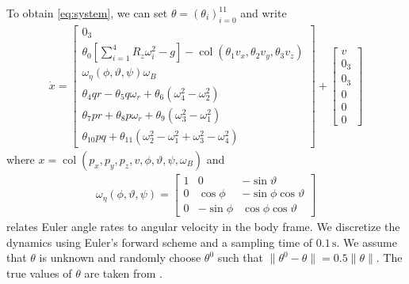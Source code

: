 \documentclass[journal,twoside,web,final]{ieeecolor}
\theoremstyle{definition}
\begin{document}
To obtain \cref{eq:system}, we can set $\theta=(\theta_i)_{i=0}^{11}$ and write
\begin{align*}
\dot{x} = \begin{bmatrix}
0_3\\
\theta_0 [\sum_{i=1}^{4} R_z\omega_i^2 - g] - \operatorname*{col}(\theta_1 v_x , \theta_2 v_y, \theta_3 v_z) \\
\omega_\eta(\phi,\vartheta,\psi) \omega_B\\
\theta_4 qr - \theta_5 q \omega_r + \theta_6 (\omega_4^2-\omega_2^2)\\
\theta_7 pr + \theta_8 p \omega_r + \theta_9 (\omega_3^2-\omega_1^2)\\
\theta_{10} pq + \theta_{11} (\omega_2^2-\omega_1^2+\omega_3^2-\omega_4^2)
\end{bmatrix}+
\begin{bmatrix}
v \\ 0_3 \\ 0_3 \\ 0 \\ 0 \\ 0
\end{bmatrix}
\end{align*}
where $x=\operatorname*{col}(p_x,p_y,p_z,v,\phi,\vartheta,\psi,\omega_B)$ and
\begin{align*}
\omega_\eta(\phi,\vartheta,\psi) = \begin{bmatrix}
1 & 0 & -\sin{\vartheta}\\
0 & \cos{\phi} & -\sin{\phi}\cos{\vartheta}\\
0 & -\sin{\phi} & \cos{\phi}\cos{\vartheta}
\end{bmatrix}
\end{align*}
relates Euler angle rates to angular velocity in the body frame.
We discretize the dynamics using Euler's forward scheme and a sampling time of $0.1\,\text{s}$.
We assume that $\theta$ is unknown and randomly choose $\theta^0$ such that $\|\theta^0-\theta\|=0.5 \|\theta\|$.
The true values of $\theta$ are taken from \cite[Table 1]{abdulkareem2022modeling}.
\end{document}
